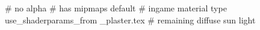 # no alpha
# has mipmaps
default			 # ingame material type
use_shaderparams_from
_plaster.tex		 # remaining diffuse sun light